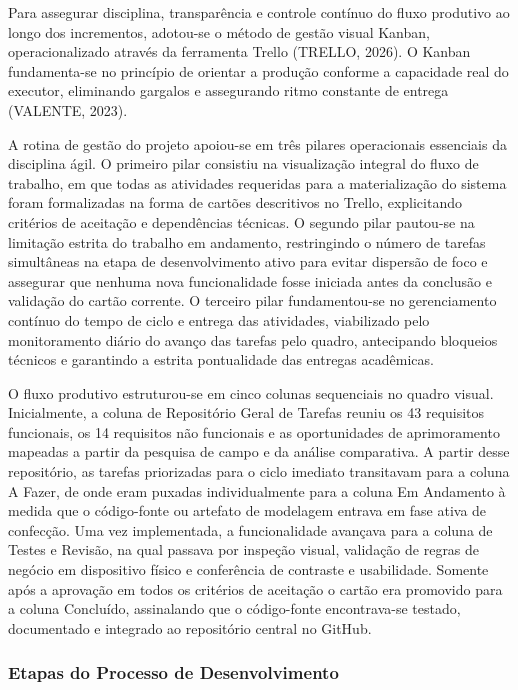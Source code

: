 Para assegurar disciplina, transparência e controle contínuo do fluxo produtivo ao longo dos incrementos, adotou-se o método de gestão visual Kanban, operacionalizado através da ferramenta Trello (TRELLO, 2026). O Kanban fundamenta-se no princípio de orientar a produção conforme a capacidade real do executor, eliminando gargalos e assegurando ritmo constante de entrega (VALENTE, 2023).

A rotina de gestão do projeto apoiou-se em três pilares operacionais essenciais da disciplina ágil. O primeiro pilar consistiu na visualização integral do fluxo de trabalho, em que todas as atividades requeridas para a materialização do sistema foram formalizadas na forma de cartões descritivos no Trello, explicitando critérios de aceitação e dependências técnicas. O segundo pilar pautou-se na limitação estrita do trabalho em andamento, restringindo o número de tarefas simultâneas na etapa de desenvolvimento ativo para evitar dispersão de foco e assegurar que nenhuma nova funcionalidade fosse iniciada antes da conclusão e validação do cartão corrente. O terceiro pilar fundamentou-se no gerenciamento contínuo do tempo de ciclo e entrega das atividades, viabilizado pelo monitoramento diário do avanço das tarefas pelo quadro, antecipando bloqueios técnicos e garantindo a estrita pontualidade das entregas acadêmicas.

O fluxo produtivo estruturou-se em cinco colunas sequenciais no quadro visual. Inicialmente, a coluna de Repositório Geral de Tarefas reuniu os 43 requisitos funcionais, os 14 requisitos não funcionais e as oportunidades de aprimoramento mapeadas a partir da pesquisa de campo e da análise comparativa. A partir desse repositório, as tarefas priorizadas para o ciclo imediato transitavam para a coluna A Fazer, de onde eram puxadas individualmente para a coluna Em Andamento à medida que o código-fonte ou artefato de modelagem entrava em fase ativa de confecção. Uma vez implementada, a funcionalidade avançava para a coluna de Testes e Revisão, na qual passava por inspeção visual, validação de regras de negócio em dispositivo físico e conferência de contraste e usabilidade. Somente após a aprovação em todos os critérios de aceitação o cartão era promovido para a coluna Concluído, assinalando que o código-fonte encontrava-se testado, documentado e integrado ao repositório central no GitHub.

\clearpage

\subsubsection{Etapas do Processo de Desenvolvimento}

